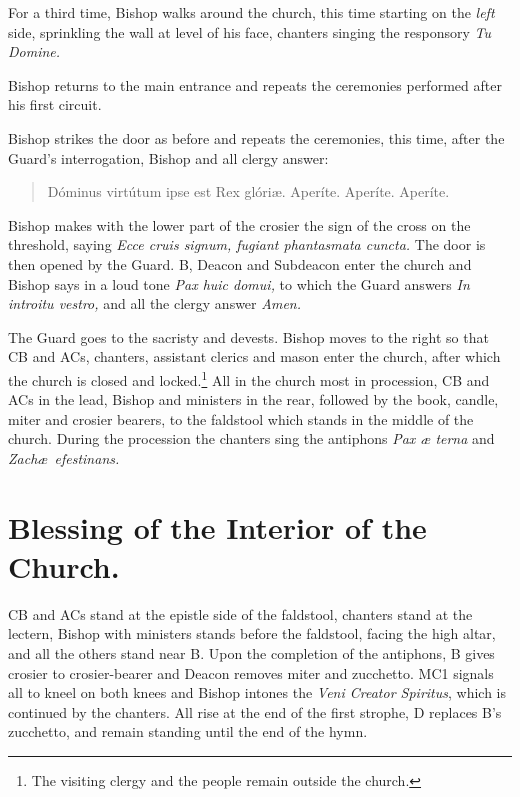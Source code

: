 \documentclass[letterpaper]{report}
\begin{document}
{\rubric For a third time, Bishop walks around the church, this time starting on the
\textit{left} side, sprinkling the wall at level of his face, chanters singing
the responsory \textit{Tu Domine.}

\rubric Bishop returns to the main entrance and repeats the ceremonies performed
after his first circuit.

\rubric Bishop strikes the door as before and repeats the ceremonies, this
time, after the Guard's interrogation, Bishop and all clergy answer:

\begin{quote}
    Dóminus virtútum ipse est Rex glóri\ae. Aperíte. Aperíte. Aperíte.
\end{quote}

\rubric Bishop makes with the lower part of the crosier the sign of the cross on the
threshold, saying \textit{Ecce cru\cross is signum, fugiant phantasmata
cuncta.} The door is then opened by the Guard. B, Deacon and Subdeacon enter the church and
Bishop says in a loud tone \textit{Pax huic domui,} to which the Guard answers
\textit{In introitu vestro,} and all the clergy answer \textit{Amen.}

\rubric The Guard goes to the sacristy and devests. Bishop moves to the right so
that CB and ACs, chanters, assistant clerics and mason enter the church, after
which the church is closed and locked.\footnote{The visiting clergy and the
people remain outside the church.} All in the church most in procession, CB and
ACs in the lead, Bishop and ministers in the rear, followed by the book, candle,
miter and crosier bearers, to the faldstool which stands in the middle of the
church. During the procession the chanters sing the antiphons \textit{Pax \ae
terna} and \textit{Zach\ae\ efestinans.}

\section{Blessing of the Interior of the Church.}

\rubric CB and ACs stand at the epistle side of the faldstool, chanters stand
at the lectern, Bishop with ministers stands before the faldstool, facing the high
altar, and all the others stand near B. Upon the completion of the antiphons, B
gives crosier to crosier-bearer and Deacon removes miter and zucchetto. MC1 signals
all to kneel on both knees and Bishop intones the \textit{Veni Creator Spiritus},
which is continued by the chanters. All rise at the end of the first strophe, D
replaces B's zucchetto, and remain standing until the end of the hymn.

}
\end{document}
